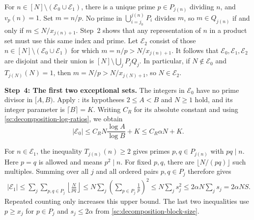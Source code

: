 \documentclass[twoside]{aomart}
\makeatletter
\theoremstyle{paperplain}
\theoremstyle{paperdefinition}
\renewenvironment{proof}[1][\proofname]{\par\pushQED{\qed}%
  \normalfont\topsep6\p@\@plus3\p@\relax\trivlist
  \item[\hskip\labelsep\itshape #1\@addpunct{.}]\ignorespaces
}{\popQED\endtrivlist\@endpefalse}
\numberwithin{equation}{section}
\makeatother
\begin{document}
\begin{proof}
For $n\in[N]\setminus(\mathcal E_0\cup\mathcal E_1)$,
there is a unique prime $p\in P_{j(n)}$ dividing $n$,
and $v_p(n)=1$. Set $m=n/p$.
No prime in $\bigcup_{i=j_0}^{j(n)}P_i$ divides $m$, so
$m\in Q_{j(n)}$ if and only if $m\le N/x_{j(n)+1}$.
Step~2 shows that any representation of $n$ in a product set
must use this same index and prime.
Let $\mathcal E_2$ consist of those
$n\in[N]\setminus(\mathcal E_0\cup\mathcal E_1)$ for which
$m=n/p>N/x_{j(n)+1}$. It follows that
$\mathcal E_0,\mathcal E_1,\mathcal E_2$ are disjoint and their
union is $[N]\setminus\bigcup_jP_jQ_j$.
In particular, if $N\notin\mathcal E_0$ and $T_{j(N)}(N)=1$, then
$m=N/p>N/x_{j(N)+1}$, so $N\in\mathcal E_2$.

\par
\medskip
\noindent\textbf{Step~4: The first two exceptional sets.}
The integers in $\mathcal E_0$ have no prime divisor in $[A,B)$.
Apply : its hypotheses $2\le A<B$ and
$N\ge1$ hold, and its integer parameter is $\lceil B\rceil=K$.
Writing $C_R$ for its absolute constant and using
\eqref{sc:decomposition-log-ratios}, we obtain
\begin{equation*}
 |\mathcal E_0|\le C_RN\frac{\log A}{\log B}+K
 \le C_R\alpha N+K.
 \end{equation*}

For $n\in\mathcal E_1$, the inequality $T_{j(n)}(n)\ge2$
gives primes $p,q\in P_{j(n)}$ with $pq\mid n$.
Here $p=q$ is allowed and means $p^2\mid n$.
For fixed $p,q$, there are $\lfloor N/(pq)\rfloor$ such multiples.
Summing over all $j$ and all ordered pairs $p,q\in P_j$ therefore gives
\begin{equation*}
 \begin{aligned}
 |\mathcal E_1|
 \le\sum_j\sum_{p,q\in P_j}\left\lfloor\frac{N}{pq}\right\rfloor
 \le N\sum_j\left(\sum_{p\in P_j}\frac1p\right)^2
 \le N\sum_js_j^2\le2\alpha N\sum_js_j=2\alpha NS.
 \end{aligned}
 \end{equation*}
Repeated counting only increases this upper bound.
The last two inequalities use $p\ge x_j$ for $p\in P_j$
and $s_j\le2\alpha$ from \eqref{sc:decomposition-block-size}.


\end{proof}
\end{document}

